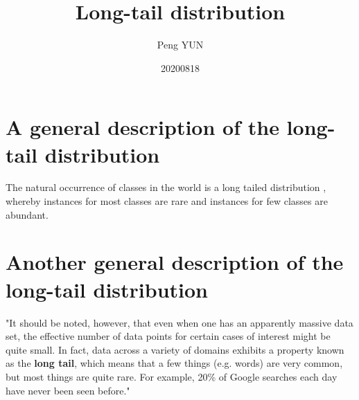 \documentclass{article}
\title{Long-tail distribution}
\author{Peng YUN}
\date{20200818}
\begin{document}
    \maketitle
\section{A general description of the long-tail distribution}
The natural occurrence of classes in the world is a long
tailed distribution \cite{Zhu_2014_CVPR,van2017devil,Wang2017tail},
whereby instances for most classes are rare and instances for few classes are abundant.

\section{Another general description of the long-tail distribution}
"It should be noted, however, that even when one has an apparently massive data set, the effective number of data points for certain cases of interest might be quite small. In fact, data across a variety of domains exhibits a property known as the \textbf{long tail}, which means that a few things (e.g. words) are very common, but most things are quite rare. For example, 20\% of Google searches each day have never been seen before\cite{murphy2012machine}."


\end{document}
